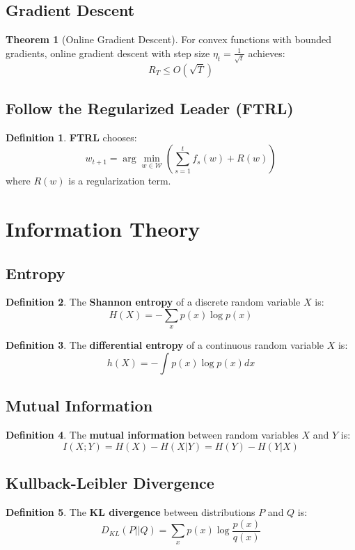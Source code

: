 \documentclass[11pt]{article}
\theoremstyle{definition}
\newtheorem{definition}{Definition}[section]
\newtheorem{theorem}{Theorem}[section]
\begin{document}
\subsection{Gradient Descent}
\begin{theorem}[Online Gradient Descent]
For convex functions with bounded gradients, online gradient descent with step size $\eta_t = \frac{1}{\sqrt{t}}$ achieves:
$$R_T \leq O(\sqrt{T})$$
\end{theorem}

\subsection{Follow the Regularized Leader (FTRL)}
\begin{definition}
\textbf{FTRL} chooses:
$$w_{t+1} = \arg\min_{w \in \mathcal{W}} \left(\sum_{s=1}^t f_s(w) + R(w)\right)$$
where $R(w)$ is a regularization term.
\end{definition}

\section{Information Theory}

\subsection{Entropy}
\begin{definition}
The \textbf{Shannon entropy} of a discrete random variable $X$ is:
$$H(X) = -\sum_{x} p(x) \log p(x)$$
\end{definition}

\begin{definition}
The \textbf{differential entropy} of a continuous random variable $X$ is:
$$h(X) = -\int p(x) \log p(x) dx$$
\end{definition}

\subsection{Mutual Information}
\begin{definition}
The \textbf{mutual information} between random variables $X$ and $Y$ is:
$$I(X;Y) = H(X) - H(X|Y) = H(Y) - H(Y|X)$$
\end{definition}

\subsection{Kullback-Leibler Divergence}
\begin{definition}
The \textbf{KL divergence} between distributions $P$ and $Q$ is:
$$D_{KL}(P||Q) = \sum_x p(x) \log \frac{p(x)}{q(x)}$$
\end{definition}
\end{document}
